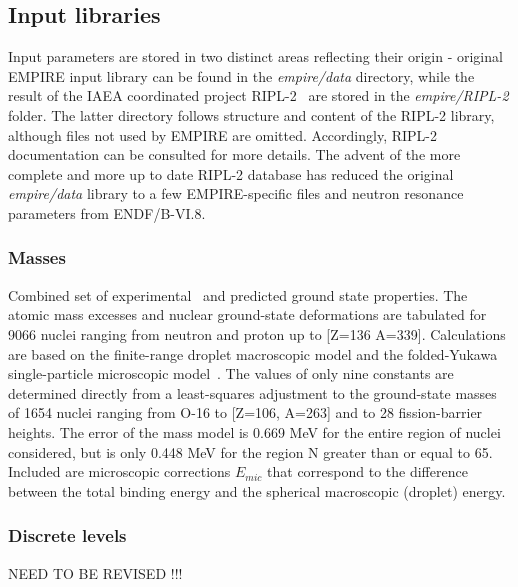 \documentclass[twocolumn,amsmath,amssymb,10pt,groupedaddress,a4paper]{revtex4}
\begin{document}
\subsection{Input libraries}

Input parameters are stored in two distinct areas reflecting their
origin - original EMPIRE input library can be found in the \emph{empire/data}
directory, while the result of the IAEA coordinated project RIPL-2~\cite{RIPL2}
are stored in the \emph{empire/RIPL-2} folder. The latter directory
follows structure and content of the RIPL-2 library, although files
not used by EMPIRE are omitted. Accordingly, RIPL-2 documentation
can be consulted for more details. The advent of the more complete
and more up to date RIPL-2 database has reduced the original \emph{empire/data}
library to a few EMPIRE-specific files and neutron resonance parameters
from ENDF/B-VI.8.

\subsubsection{Masses}
Combined set of experimental~\cite{Audi} and predicted ground state
properties. The atomic mass excesses and nuclear ground-state deformations
are tabulated for 9066 nuclei ranging from neutron and proton up to
{[}Z=136 A=339{]}. Calculations are based on the finite-range droplet
macroscopic model and the folded-Yukawa single-particle microscopic
model~\cite{Moller95}. The values of only nine constants are determined
directly from a least-squares adjustment to the ground-state masses
of 1654 nuclei ranging from O-16 to {[}Z=106, A=263{]} and to 28 fission-barrier
heights. The error of the mass model is 0.669 MeV for the entire region
of nuclei considered, but is only 0.448 MeV for the region N greater
than or equal to 65. Included are microscopic corrections $E_{mic}$
that correspond to the difference between the total binding energy
and the spherical macroscopic (droplet) energy.

\subsubsection{Discrete levels}
NEED TO BE REVISED !!!
\end{document}
